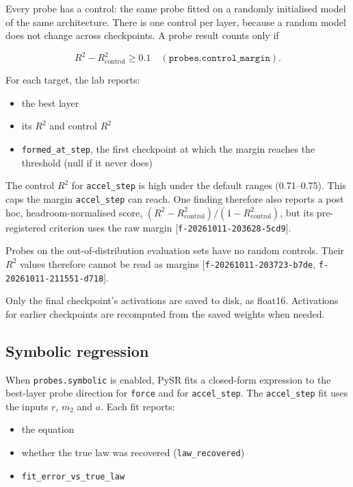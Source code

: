 \documentclass{article}
\begin{document}
Every probe has a control: the same probe fitted on a randomly initialised model of the same architecture. There is one control per layer, because a random model does not change across checkpoints. A probe result counts only if

\[R^2 - R^2_{\text{control}} \geq 0.1 \quad (\texttt{probes.control\_margin}).\]

For each target, the lab reports:

\begin{itemize}
\item the best layer
\item its $R^2$ and control $R^2$
\item \texttt{formed\_at\_step}, the first checkpoint at which the margin reaches the threshold (null if it never does)
\end{itemize}

The control $R^2$ for \texttt{accel\_step} is high under the default ranges (0.71–0.75). This caps the margin \texttt{accel\_step} can reach. One finding therefore also reports a post hoc, headroom-normalised score, $(R^2 - R^2_{\text{control}})/(1 - R^2_{\text{control}})$, but its pre-registered criterion uses the raw margin [\texttt{f-20261011-203628-5cd9}].

Probes on the out-of-distribution evaluation sets have no random controls. Their $R^2$ values therefore cannot be read as margins [\texttt{f-20261011-203723-b7de}, \texttt{f-20261011-211551-d718}].

Only the final checkpoint's activations are saved to disk, as float16. Activations for earlier checkpoints are recomputed from the saved weights when needed.

\subsection{Symbolic regression}

When \texttt{probes.symbolic} is enabled, PySR fits a closed-form expression to the best-layer probe direction for \texttt{force} and for \texttt{accel\_step}. The \texttt{accel\_step} fit uses the inputs $r$, $m_2$ and $a$. Each fit reports:

\begin{itemize}
\item the equation
\item whether the true law was recovered (\texttt{law\_recovered})
\item \texttt{fit\_error\_vs\_true\_law}
\end{itemize}
\end{document}

